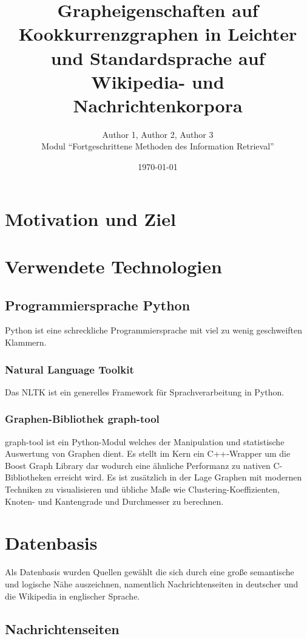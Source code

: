 \documentclass[12pt, a4paper]{article}
\title{Grapheigenschaften auf Kookkurrenzgraphen in Leichter und Standardsprache auf Wikipedia- und Nachrichtenkorpora}
\author{Author 1, Author 2, Author 3\\Modul "`Fortgeschrittene Methoden des Information Retrieval"'}
\date{\today}
\begin{document}
\maketitle
\tableofcontents

\section{Motivation und Ziel}
\section{Verwendete Technologien}
\subsection{Programmiersprache Python}

Python ist eine schreckliche Programmiersprache mit viel zu wenig geschweiften
Klammern.

\subsubsection{Natural Language Toolkit}

Das NLTK ist ein generelles Framework f\"ur Sprachverarbeitung in Python.

\subsubsection{Graphen-Bibliothek graph-tool}

graph-tool ist ein Python-Modul welches der Manipulation und statistische
Auswertung von Graphen dient. Es stellt im Kern ein C++-Wrapper um die Boost
Graph Library dar wodurch eine \"ahnliche Performanz zu nativen C-Bibliotheken
erreicht wird. Es ist zus\"atzlich in der Lage Graphen mit modernen Techniken
zu visualisieren und \"ubliche Ma\ss{}e wie Clustering-Koeffizienten, Knoten-
und Kantengrade und Durchmesser zu berechnen.

\section{Datenbasis}

Als Datenbasis wurden Quellen gew\"ahlt die sich durch eine gro\ss{}e
semantische und logische N\"ahe auszeichnen, namentlich Nachrichtenseiten in
deutscher und die Wikipedia in englischer Sprache.

\subsection{Nachrichtenseiten}
\end{document}
